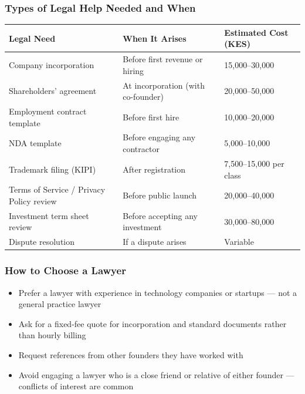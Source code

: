 \documentclass[12pt,a4paper]{article}
\begin{document}
\subsubsection{Types of Legal Help Needed and When}

\begin{tabularx}{\linewidth}{L{3.5cm} L{4.5cm} X}
  \toprule
  \textbf{Legal Need} & \textbf{When It Arises} & \textbf{Estimated Cost (KES)} \\
  \midrule
  Company incorporation          & Before first revenue or hiring          & 15{,}000--30{,}000 \\[0.3em]
  Shareholders' agreement        & At incorporation (with co-founder)      & 20{,}000--50{,}000 \\[0.3em]
  Employment contract template   & Before first hire                       & 10{,}000--20{,}000 \\[0.3em]
  NDA template                   & Before engaging any contractor          & 5{,}000--10{,}000 \\[0.3em]
  Trademark filing (KIPI)        & After registration                      & 7{,}500--15{,}000 per class \\[0.3em]
  Terms of Service / Privacy Policy review & Before public launch           & 20{,}000--40{,}000 \\[0.3em]
  Investment term sheet review   & Before accepting any investment         & 30{,}000--80{,}000 \\[0.3em]
  Dispute resolution             & If a dispute arises                     & Variable \\
  \bottomrule
\end{tabularx}

\subsubsection{How to Choose a Lawyer}

\begin{itemize}
  \item Prefer a lawyer with experience in technology companies or startups --- not a general practice lawyer
  \item Ask for a fixed-fee quote for incorporation and standard documents rather than hourly billing
  \item Request references from other founders they have worked with
  \item Avoid engaging a lawyer who is a close friend or relative of either founder --- conflicts of interest are common
\end{itemize}
\end{document}
